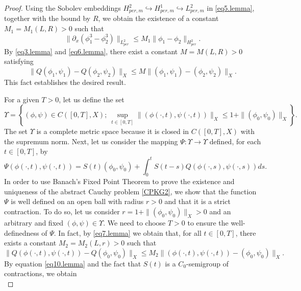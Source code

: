 \documentclass[12pt,reqno,a4paper]{amsart} %
\numberwithin{equation}{section}
\numberwithin{figure}{section}
\begin{document}
\begin{proof}
Using the Sobolev embeddings $H_{per,m}^2 \hookrightarrow H_{per,m}^1\hookrightarrow L_{per,m}^2$ in \eqref{eq5.lemma}, together with the bound by 
$R$, we obtain the existence of a constant $M_1=M_1(L,R)>0$ such that 
 \begin{equation}\label{eq6.lemma}
 		\|\partial_x (\phi_1^3-\phi_2^3)\|_{L_{per}^2}\leq M_1 \|\phi_1 -\phi_2  \|_{H_{per}^2}. 
 		\end{equation}
 		By \eqref{eq3.lemma} and \eqref{eq6.lemma}, there exist a constant $M=M(L,R)>0$ satisfying
 \begin{equation}\label{eq7.lemma}  
 		\|Q(\phi_1, \psi_1)-Q(\phi_2, \psi_2)\|_X\leq  M \|(\phi_1,\psi_1)-(\phi_2, \psi_2)\|_X.
\end{equation} This fact establishes the desired result.%

For a given $T>0$, let us define the set
\begin{equation}\label{eq8.lemma}  
	\Upsilon=\left\{(\phi,\psi)\in C([0,T], X);\ \sup_{t\in [0,T]}\|(\phi(\cdot,t), \psi(\cdot,t))\|_X\leq 1+\|(\phi_0, \psi_0)\|_X\right\}.
\end{equation}
The set $	\Upsilon$ is a complete metric space because it is closed in $C([0,T],X)$ with the supremum norm. Next, let us consider the mapping $\Psi: \Upsilon\rightarrow\Upsilon$ defined, for each $t\in [0,T]$, by
\begin{equation}\label{eq9.lemma}  
	\Psi(\phi(\cdot,t), \psi(\cdot, t))=S(t)(\phi_0,\psi_0)+\int_{0}^{t}S(t-s)Q(\phi(\cdot,s),\psi(\cdot,s))ds.
\end{equation}
In order to use Banach’s Fixed Point Theorem to prove the existence and uniqueness of the abstract Cauchy problem \eqref{CPKG2}, we show that the function $\Psi$ is well defined on an open ball with radius $r>0$ and that it is a strict contraction. To do so, let us consider $r=1+\|(\phi_0, \psi_0)\|_X>0$ and an arbitrary and fixed 
$(\phi,\psi)\in \Upsilon$. We need to choose $T>0$ to ensure the well-definedness of $\Psi$. In fact, by \eqref{eq7.lemma} we obtain that, for all $t\in [0,T]$, there exists a constant $M_2=M_2(L,r)>0$ such that
\begin{equation}\label{eq10.lemma}  
		\|Q(\phi(\cdot,t), \psi(\cdot,t))-Q(\phi_0, \psi_0)\|_X\leq  M_2 \|(\phi(\cdot,t),\psi(\cdot,t))-(\phi_0, \psi_0)\|_X. 
\end{equation}
By equation \eqref{eq10.lemma} and the fact that $S(t)$ is a $C_0$-semigroup of contractions, we obtain 
\begin{equation}\label{eq11.lemma}  

\end{equation}
\end{proof}
\end{document}
